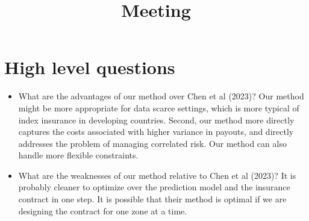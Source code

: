 \documentclass[11pt]{article}
\title{Meeting}
\begin{document}
\maketitle
\section{High level questions}
  \begin{itemize}
    \item What are the advantages of our method over Chen et al (2023)? Our method might be more appropriate for data scarce settings, which is more typical of index insurance in developing countries. Second, our method more directly captures the costs associated with higher variance in payouts, and directly addresses the problem of managing correlated risk. Our method can also handle more flexible constraints.
    \item What are the weaknesses of our method relative to Chen et al (2023)? It is probably cleaner to optimize over the prediction model and the insurance contract in one step. It is possible that their method is optimal if we are designing the contract for one zone at a time. 
  \end{itemize}

\end{document}
